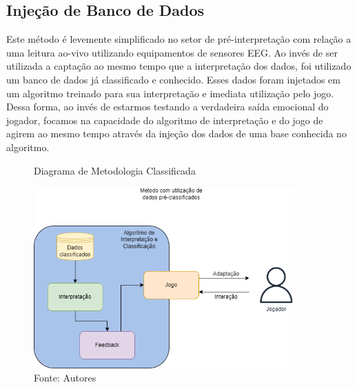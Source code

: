 

\subsection{Injeção de Banco de Dados}
Este método é levemente simplificado no setor de pré-interpretação com relação a uma leitura ao-vivo utilizando equipamentos de sensores EEG. Ao invés de ser utilizada a captação ao mesmo tempo que a interpretação dos dados, foi utilizado um banco de dados já classificado e conhecido. Esses dados foram injetados em um algoritmo treinado para sua interpretação e imediata utilização pelo jogo. Dessa forma, ao invés de estarmos testando a verdadeira saída emocional do jogador, focamos na capacidade do algoritmo de interpretação e do jogo de agirem ao mesmo tempo através da injeção dos dados de uma base conhecida no algoritmo. 

\begin{figure}[h]
    \centering
    \caption{Diagrama de Metodologia Classificada}
    \includegraphics[width=10cm]{Figuras/diagrama-metodologia-dois.drawio.png}
    \caption*{Fonte: Autores}
    \label{fig:diagrama_metodologia}
\end{figure}

